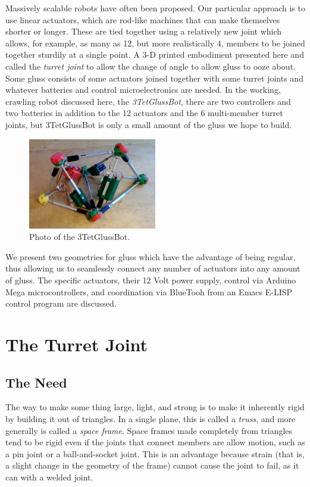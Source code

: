 \documentclass[12pt]{article}
\begin{document}
Massively scalable robots have often been proposed. Our particular approach is to use linear actuators,
which are rod-like machines that can make themselves shorter or longer. These are tied together using
a relatively new joint \cite{song2003spherical} which allows, for example, as many as 12, but more realistically 4,
members to be joined together sturdily at a single point.
A 3-D printed embodiment presented here and called the \emph{turret joint} to allow the
change of angle to allow gluss to ooze about. Some gluss consists of some actuators joined together
with some turret joints and whatever batteries and control microelectronics are needed. In the
working, crawling robot discussed here, the \emph{3TetGlussBot}, there are two controllers and two batteries
in addition to the 12 actuators and the 6 multi-member turret joints, but 3TetGlussBot is only
a small amount of the gluss we hope to build.

\begin{figure}[!ht]
  \centering
    \includegraphics[width=0.5\textwidth]{3TetGlussBotPhoto.png}
    \caption[3TetGlussBot Photo]{Photo of the 3TetGlussBot.}
      \label{3TetGlussBotPhoto}
\end{figure}


We present two geometries for gluss which have the advantage of being regular, thus allowing us to
seamlessly connect any number of actuators into any amount of gluss.
The specific actuators, their 12 Volt power supply, control via Arduino Mega microcontrollers, and
coordination via BlueTooh from an Emacs E-LISP control program are discussed.

\section{The Turret Joint}

\subsection{The Need}

The way to make some thing large, light, and strong is to make it inherently rigid by building it
out of triangles. In a single plane, this is called a \emph{truss}, and more generally is called
a \emph{space frame}.  Space frames made completely from triangles tend to be rigid even if the
joints that connect members are allow motion, such as a pin joint or a ball-and-socket joint. This
is an advantage because strain (that is, a slight change in the geometry of the frame) cannot cause
the joint to fail, as it can with a welded joint.
\end{document}

